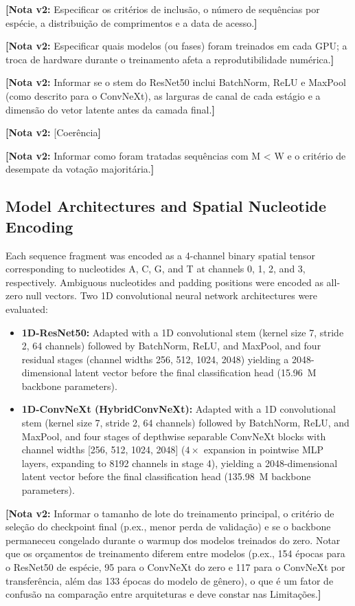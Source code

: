 \documentclass[11pt,a4paper]{article}
\newcommand{\notavdois}[1]{\par\vspace{0.4em}\noindent\colorbox{yellow!25}{\begin{minipage}{0.96\linewidth}\footnotesize\textbf{[Nota v2:} #1\textbf{]}\end{minipage}}\par\vspace{0.4em}}
\begin{document}
\notavdois{Especificar os critérios de inclusão, o número de sequências por espécie, a distribuição de comprimentos e a data de acesso.}


\notavdois{Especificar quais modelos (ou fases) foram treinados em cada GPU; a troca de hardware durante o treinamento afeta a reprodutibilidade numérica.}


\notavdois{Informar se o stem do ResNet50 inclui BatchNorm, ReLU e MaxPool (como descrito para o ConvNeXt), as larguras de canal de cada estágio e a dimensão do vetor latente antes da camada final.}


\notavdois{[Coerência}


\notavdois{Informar como foram tratadas sequências com M < W e o critério de desempate da votação majoritária.}


\subsection{Model Architectures and Spatial Nucleotide Encoding}
Each sequence fragment was encoded as a 4-channel binary spatial tensor corresponding to nucleotides A, C, G, and T at channels 0, 1, 2, and 3, respectively. Ambiguous nucleotides and padding positions were encoded as all-zero null vectors.
Two 1D convolutional neural network architectures were evaluated:
\begin{itemize}
\item \textbf{1D-ResNet50:} Adapted with a 1D convolutional stem (kernel size 7, stride 2, 64 channels) followed by BatchNorm, ReLU, and MaxPool, and four residual stages (channel widths 256, 512, 1024, 2048) yielding a 2048-dimensional latent vector before the final classification head (15.96~M backbone parameters).
\item \textbf{1D-ConvNeXt (HybridConvNeXt):} Adapted with a 1D convolutional stem (kernel size 7, stride 2, 64 channels) followed by BatchNorm, ReLU, and MaxPool, and four stages of depthwise separable ConvNeXt blocks with channel widths [256, 512, 1024, 2048] ($4\times$ expansion in pointwise MLP layers, expanding to 8192 channels in stage 4), yielding a 2048-dimensional latent vector before the final classification head (135.98~M backbone parameters).
\end{itemize}

\notavdois{Informar o tamanho de lote do treinamento principal, o critério de seleção do checkpoint final (p.ex., menor perda de validação) e se o backbone permaneceu congelado durante o warmup dos modelos treinados do zero. Notar que os orçamentos de treinamento diferem entre modelos (p.ex., 154 épocas para o ResNet50 de espécie, 95 para o ConvNeXt do zero e 117 para o ConvNeXt por transferência, além das 133 épocas do modelo de gênero), o que é um fator de confusão na comparação entre arquiteturas e deve constar nas Limitações.}
\end{document}
